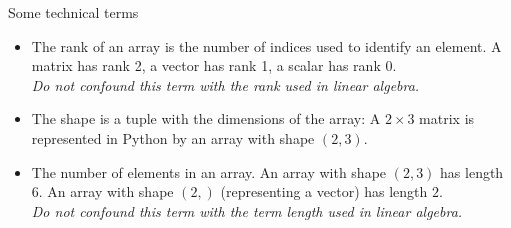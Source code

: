 \documentclass[hyperref={pdfpagelabels=false},table]{beamer}
\begin{document}
\begin{frame}[fragile]{Some technical terms}
\vfill
\begin{itemize}
 \item[Rank] The rank of an array is the number of indices used to identify an element.
A matrix has rank 2, a vector has rank 1, a scalar has rank 0.\\ \emph{Do not confound this term with the
rank used in linear algebra.}
\item[Shape] The shape is a tuple with the dimensions of the array: A $2 \times 3$ matrix is
represented in Python by an array with shape $(2,3)$.
\item[Length] The number of elements in an array. An array with shape $(2,3)$ has length $6$.
An array with shape $(2,)$ (representing a vector) has length $2$.\\
\emph{Do not confound this term with the term length used in linear algebra.}
\end{itemize}
\vfill
\end{frame}
\end{document}
